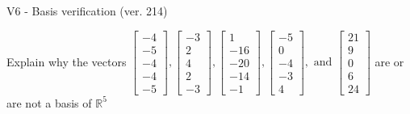 \begin{exercise}
  \begin{exerciseTitle}V6 - Basis verification (ver. 214)\end{exerciseTitle}
  \begin{exerciseStatement}
    Explain why the vectors \(\left[\begin{array}{r}
-4 \\
-5 \\
-4 \\
-4 \\
-5
\end{array}\right] , \left[\begin{array}{r}
-3 \\
2 \\
4 \\
2 \\
-3
\end{array}\right] , \left[\begin{array}{r}
1 \\
-16 \\
-20 \\
-14 \\
-1
\end{array}\right] , \left[\begin{array}{r}
-5 \\
0 \\
-4 \\
-3 \\
4
\end{array}\right] , \text{ and } \left[\begin{array}{r}
21 \\
9 \\
0 \\
6 \\
24
\end{array}\right]\) are or are not a basis of \(\mathbb{R}^5\)	



\end{exerciseStatement}
\end{exercise}
